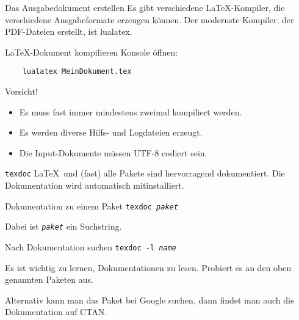 \begin{frame}[fragile]{Das Ausgabedokument erstellen}
  Es gibt verschiedene \LaTeX-Kompiler, die verschiedene Ausgabeformate erzeugen können.
  Der modernste Kompiler, der PDF-Dateien erstellt, ist \alert{lualatex}.

  \begin{block}{\LaTeX-Dokument kompilieren}
    Konsole öffnen:
    \begin{lstlisting}
    lualatex MeinDokument.tex
    \end{lstlisting}
  \end{block}
  \begin{alertblock}{Vorsicht!}
    \begin{itemize}
      \item Es muss fast immer mindestens zweimal kompiliert werden.
      \item Es werden diverse Hilfs- und Logdateien erzeugt.
      \item Die Input-Dokumente müssen UTF-8 codiert sein.
    \end{itemize}
  \end{alertblock}
\end{frame}

\begin{frame}{\texttt{texdoc}}
  \LaTeX\ und (fast) alle Pakete sind hervorragend dokumentiert. Die Dokumentation wird automatisch mitinstalliert.
  \begin{block}{Dokumentation zu einem Paket}
    \texttt{texdoc \textit{paket}}
  \end{block}

  Dabei ist \texttt{\textit{paket}} ein Suchstring.
  \begin{block}{Nach Dokumentation suchen}
    \texttt{texdoc -l \textit{name}}
  \end{block}

  Es ist wichtig zu lernen, Dokumentationen zu lesen. Probiert es an den oben genannten Paketen aus.

  \vspace{10pt}
  Alternativ kann man das Paket bei Google suchen, dann findet man auch die Dokumentation auf CTAN.
\end{frame}
